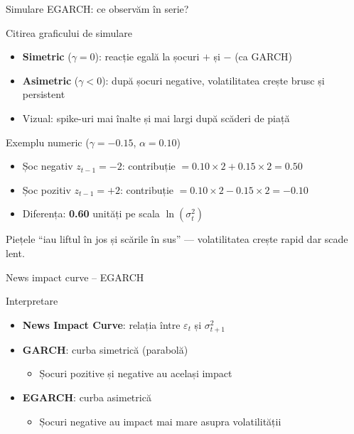 \documentclass[9pt, aspectratio=169, t]{beamer}
\begin{document}
\begin{frame}{Simulare EGARCH: ce observăm în serie?}
    \small
        \begin{block}{Citirea graficului de simulare}
            \begin{itemize}
                \item \textbf{Simetric} ($\gamma = 0$): reacție egală la șocuri $+$ și $-$ (ca GARCH)
                \item \textbf{Asimetric} ($\gamma < 0$): după șocuri negative, volatilitatea crește brusc și persistent
                \item Vizual: spike-uri mai înalte și mai largi după scăderi de piață
            \end{itemize}
        \end{block}
        \vspace{-1mm}
        \begin{exampleblock}{Exemplu numeric ($\gamma = -0.15$, $\alpha = 0.10$)}
            \begin{itemize}
                \item Șoc negativ $z_{t-1} = -2$: contribuție $= 0.10 \times 2 + 0.15 \times 2 = 0.50$
                \item Șoc pozitiv $z_{t-1} = +2$: contribuție $= 0.10 \times 2 - 0.15 \times 2 = -0.10$
                \item Diferența: \textbf{0.60} unități pe scala $\ln(\sigma_t^2)$
            \end{itemize}
        \end{exampleblock}
        \vspace{-1mm}
        \begin{alertblock}{Piețele ``iau liftul în jos și scările în sus'' --- volatilitatea crește rapid dar scade lent.}
        \end{alertblock}
\end{frame}

\begin{frame}{News impact curve -- EGARCH}
    \small
        \begin{block}{Interpretare}
            \begin{itemize}
                \item \textbf{News Impact Curve}: relația între $\varepsilon_t$ și $\sigma_{t+1}^2$
                \item \textbf{GARCH}: curba simetrică (parabolă)
                    \begin{itemize}
                        \item Șocuri pozitive și negative au același impact
                    \end{itemize}
                \item \textbf{EGARCH}: curba asimetrică
                    \begin{itemize}
                        \item Șocuri negative au impact mai mare asupra volatilității
                    \end{itemize}
            \end{itemize}
        \end{block}
\end{frame}
\end{document}
